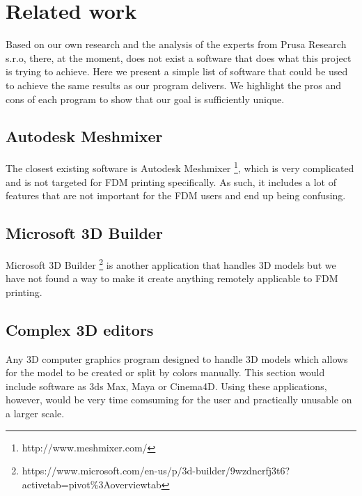 
\chapter{Related work}

Based on our own research and the analysis of the experts from Prusa Research s.r.o, there, at the moment, does not exist a software that does what this project is trying to achieve. Here we present a simple list of software that could be used to achieve the same results as our program delivers. We highlight the pros and cons of each program to show that our goal is sufficiently unique.

\section{Autodesk Meshmixer}

The closest existing software is Autodesk Meshmixer \footnote{http://www.meshmixer.com/}, which is very complicated and is not targeted for FDM printing specifically. As such, it includes a lot of features that are not important for the FDM users and end up being confusing.

\section{Microsoft 3D Builder}

Microsoft 3D Builder \footnote{https://www.microsoft.com/en-us/p/3d-builder/9wzdncrfj3t6?activetab=pivot\%3Aoverviewtab} is another application that handles 3D models but we have not found a way to make it create anything remotely applicable to FDM printing.

\section{Complex 3D editors}

Any 3D computer graphics program designed to handle 3D models which allows for the model to be created or split by colors manually. This section would include software as 3ds Max, Maya or Cinema4D. Using these applications, however, would be very time comsuming for the user and practically unusable on a larger scale.

